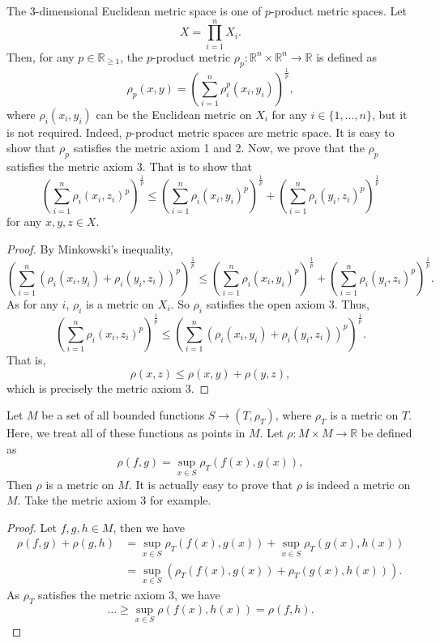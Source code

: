\documentclass{report}
\begin{document}
\begin{example}
	The 3-dimensional Euclidean metric space is one of $p$-product metric spaces. Let
	$$
	X = \prod_{i = 1}^n X_i.
	$$
	Then, for any $p \in \mathbb R_{\ge 1}$, the $p$-product metric $\rho_p: \mathbb R^n \times \mathbb R^n \to \mathbb R$ is defined as
	$$
	\rho_p(x, y) = \left( \sum_{i = 1}^n \rho_i^p(x_i, y_i) \right)^\frac{1}{p},
	$$
	where $\rho_i(x_i, y_i)$ can be the Euclidean metric on $X_i$ for any $i \in \{1, \ldots, n\}$, but it is not required. Indeed, $p$-product metric spaces are metric space. It is easy to show that $\rho_p$ satisfies the metric axiom 1 and 2. Now, we prove that the $\rho_p$ satisfies the metric axiom 3. That is to show that
	$$
	\left( \sum_{i = 1}^n \rho_i(x_i, z_i)^p \right)^\frac{1}{p} \le \left( \sum_{i = 1}^n \rho_i(x_i, y_i)^p \right)^\frac{1}{p} + \left( \sum_{i = 1}^n \rho_i(y_i, z_i)^p \right)^\frac{1}{p}
	$$
	for any $x,y,z \in X$.
	
	\begin{proof}
		By Minkowski's inequality,
		$$
		\left( \sum_{i = 1}^n (\rho_i (x_i, y_i) + \rho_i(y_i, z_i))^p \right)^\frac{1}{p} \le \left( \sum_{i = 1}^n \rho_i(x_i, y_i)^p \right)^\frac{1}{p} + \left( \sum_{i = 1}^n \rho_i(y_i, z_i)^p \right)^\frac{1}{p}.
		$$
		As for any $i$, $\rho_i$ is a metric on $X_i$. So $\rho_i$ satisfies the open axiom 3. Thus,
		$$
		\left( \sum_{i = 1}^n \rho_i(x_i, z_i)^p \right)^\frac{1}{p} \le \left( \sum_{i = 1}^n (\rho_i (x_i, y_i) + \rho_i(y_i, z_i))^p \right)^\frac{1}{p}.
		$$
		That is,
		$$
		\rho(x, z) \le \rho(x,y) + \rho(y,z),
		$$
		which is precisely the metric axiom 3.
	\end{proof}
\end{example}



\begin{example}
	Let $M$ be a set of all bounded functions $S \to (T, \rho_T)$, where $\rho_T$ is a metric on $T$. Here, we treat all of these functions as points in $M$. Let $\rho: M \times M \to \mathbb R$ be defined as
	$$
	\rho(f,g) = \sup_{x \in S} \rho_T(f(x), g(x)),
	$$
	Then $\rho$ is a metric on $M$. It is actually easy to prove that $\rho$ is indeed a metric on $M$. Take the metric axiom 3 for example.
	
	\begin{proof}
		Let $f, g, h \in M$, then we have
		$$
		\begin{aligned}
		\rho(f, g) + \rho(g, h) &= \sup_{x \in S} \rho_T(f(x), g(x)) + \sup_{x \in S} \rho_T (g(x), h(x)) \\
		&= \sup_{x \in S} \left( \rho_T (f(x), g(x)) + \rho_T (g(x), h(x)) \right).
		\end{aligned}
		$$
		As $\rho_T$ satisfies the metric axiom 3, we have
		$$
		\ldots \ge \sup_{x \in S} \rho(f(x), h(x)) = \rho(f,h).
		$$
	\end{proof}
\end{example}
\end{document}
